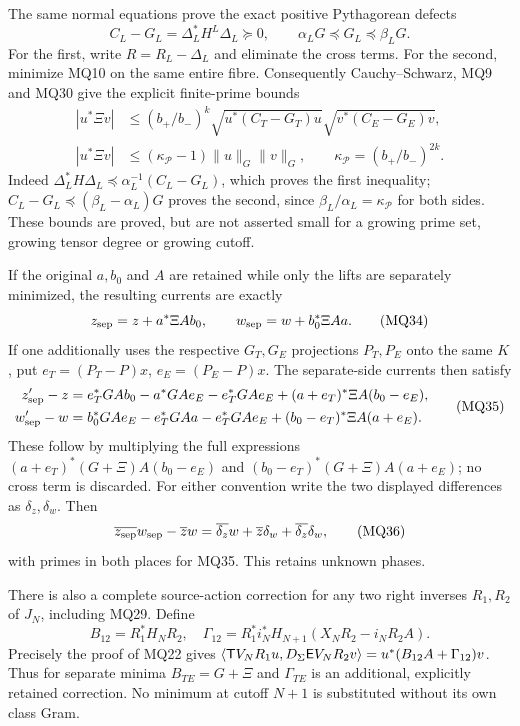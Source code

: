 The same normal equations prove the exact positive Pythagorean
defects
\[
 C_L-G_L=\Delta_L^*H^L\Delta_L\succeq0,
 \qquad \alpha_LG\preceq G_L\preceq\beta_LG.                \tag{MQ32}
\]
For the first, write $R=R_L-\Delta_L$ and eliminate the cross
terms. For the second, minimize MQ10 on the same entire fibre.
Consequently Cauchy--Schwarz, MQ9 and MQ30 give the explicit
finite-prime bounds
\[
 \begin{split}
 |u^*\Xi v|&\le (b_+/b_-)^k
  \sqrt{u^*(C_T-G_T)u}\sqrt{v^*(C_E-G_E)v},\\
 |u^*\Xi v|&\le(\kappa_{\mathcal P}-1)\|u\|_G\|v\|_G,
 \qquad \kappa_{\mathcal P}=(b_+/b_-)^{2k}.
 \end{split}                                                \tag{MQ33}
\]
Indeed $\Delta_L^*H\Delta_L\preceq
\alpha_L^{-1}(C_L-G_L)$, which proves the first inequality;
$C_L-G_L\preceq(\beta_L-\alpha_L)G$ proves the second, since
$\beta_L/\alpha_L=\kappa_{\mathcal P}$ for both sides. These
bounds are proved, but are not asserted small for a growing prime
set, growing tensor degree or growing cutoff.

If the original $a,b_0$ and $A$ are retained while only the lifts
are separately minimized, the resulting currents are exactly
\[
 z_{\rm sep}=z+a^*\Xi A b_0,\qquad
 w_{\rm sep}=w+b_0^*\Xi A a.                               \tag{MQ34}
\]
If one additionally uses the respective $G_T,G_E$ projections
$P_T,P_E$ onto the same $K$, put $e_T=(P_T-P)x$,
$e_E=(P_E-P)x$. The separate-side currents then satisfy
\[
 \begin{split}
 z_{\rm sep}'-z={}&e_T^*GA b_0-a^*GAe_E-e_T^*GAe_E
       +(a+e_T)^*\Xi A(b_0-e_E),\\
 w_{\rm sep}'-w={}&b_0^*GAe_E-e_T^*GAa-e_T^*GAe_E
       +(b_0-e_T)^*\Xi A(a+e_E).
 \end{split}                                                 \tag{MQ35}
\]
These follow by multiplying the full expressions
$(a+e_T)^*(G+\Xi)A(b_0-e_E)$ and
$(b_0-e_T)^*(G+\Xi)A(a+e_E)$; no cross term is discarded.
For either convention write the two displayed differences as
$\delta_z,\delta_w$. Then
\[
 \overline{z_{\rm sep}}w_{\rm sep}-\overline zw
   =\overline{\delta_z}w+\overline z\delta_w
     +\overline{\delta_z}\delta_w,                          \tag{MQ36}
\]
with primes in both places for MQ35. This retains unknown phases.

There is also a complete source-action correction for any two
right inverses $R_1,R_2$ of $J_N$, including MQ29. Define
\[
 B_{12}=R_1^*H_NR_2,\quad
 \Gamma_{12}=R_1^*i_N^*H_{N+1}(X_NR_2-i_NR_2A).
                                                               \tag{MQ37}
\]
Precisely the proof of MQ22 gives
$\langle\mathsf T V_NR_1u,D_\Sigma\mathsf E V_NR_2v\rangle
=u^*(B_{12}A+\Gamma_{12})v$.
Thus for separate minima $B_{TE}=G+\Xi$ and $\Gamma_{TE}$ is
an additional, explicitly retained correction. No minimum at cutoff
$N+1$ is substituted without its own class Gram.

